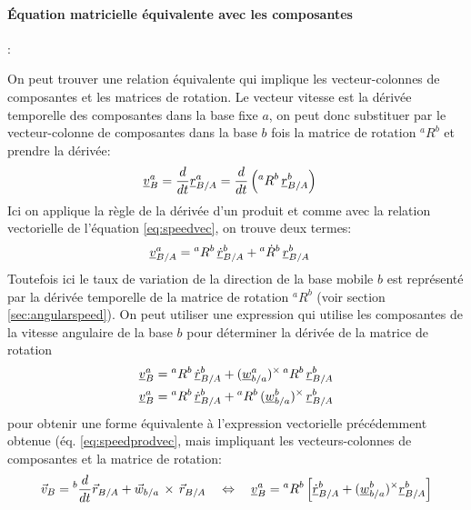 \paragraph{Équation matricielle équivalente avec les composantes}:

On peut trouver une relation équivalente qui implique les vecteur-colonnes de composantes et les matrices de rotation. Le vecteur vitesse est la dérivée temporelle des composantes dans la base fixe $a$, on peut donc substituer par le vecteur-colonne de composantes dans la base $b$ fois la matrice de rotation ${}^{a}R^b$ et prendre la dérivée:
\begin{align}
	\underline{v}_{B}^a &= \frac{d}{dt} \underline{r}_{B/A}^a =
	\frac{d}{dt} \left( {}^{a}R^b \, \underline{r}_{B/A}^b \right)
\end{align}
Ici on applique la règle de la dérivée d'un produit et comme avec la relation vectorielle de l'équation \eqref{eq:speedvec}, on trouve deux termes:
\begin{align}
	\underline{v}_{B/A}^a &=
	{}^{a}R^b \, \underline{\dot{r}}_{B/A}^b + {}^{a}\dot{R}^b \, \underline{r}_{B/A}^b
\end{align}
Toutefois ici le taux de variation de la direction de la base mobile $b$ est représenté par la dérivée temporelle de la matrice de rotation ${}^{a}R^b$ (voir section \ref{sec:angularspeed}). On peut utiliser une expression qui utilise les composantes de la vitesse angulaire de la base $b$ pour déterminer la dérivée de la matrice de rotation
\begin{align}
	\underline{v}_{B}^a &=
	{}^{a}R^b \, \underline{\dot{r}}_{B/A}^b + (\underline{w}_{b/a}^a)^{\times} \, {}^{a}R^b \, \underline{r}_{B/A}^b \\
	\underline{v}_{B}^a &=
	{}^{a}R^b \, \underline{\dot{r}}_{B/A}^b +  {}^{a}R^b \, (\underline{w}_{b/a}^b)^{\times} \, \underline{r}_{B/A}^b
\end{align}
pour obtenir une forme équivalente à l'expression vectorielle précédemment obtenue (éq. \eqref{eq:speedprodvec}, mais impliquant les vecteurs-colonnes de composantes et la matrice de rotation:
\begin{align}
	\vec{v}_{B} = {}^{b}\frac{d}{dt} \vec{r}_{B/A} +  \vec{w}_{b/a} \, \times \, \vec{r}_{B/A}
	\quad \Leftrightarrow \quad
	\underline{v}_{B}^{a} = {}^{a}R^b \left[ \underline{\dot{r}}^b_{B/A} +  (\underline{w}_{b/a}^b)^{\times} \underline{r}^b_{B/A}  \right]
\end{align}



